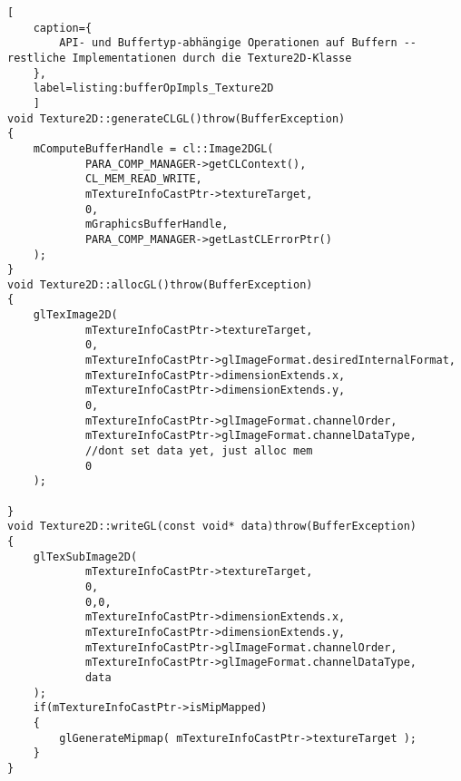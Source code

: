 \begin{lstlisting}[
	caption={
		API- und Buffertyp-abhängige Operationen auf Buffern -- restliche Implementationen durch die Texture2D-Klasse
	},	
	label=listing:bufferOpImpls_Texture2D
	]	
void Texture2D::generateCLGL()throw(BufferException)
{
	mComputeBufferHandle = cl::Image2DGL(
			PARA_COMP_MANAGER->getCLContext(),
			CL_MEM_READ_WRITE,
			mTextureInfoCastPtr->textureTarget,
			0,
			mGraphicsBufferHandle,
			PARA_COMP_MANAGER->getLastCLErrorPtr()
	);
}
void Texture2D::allocGL()throw(BufferException)
{
	glTexImage2D(
			mTextureInfoCastPtr->textureTarget,
			0,
			mTextureInfoCastPtr->glImageFormat.desiredInternalFormat,
			mTextureInfoCastPtr->dimensionExtends.x,
			mTextureInfoCastPtr->dimensionExtends.y,
			0,
			mTextureInfoCastPtr->glImageFormat.channelOrder,
			mTextureInfoCastPtr->glImageFormat.channelDataType,
			//dont set data yet, just alloc mem
			0
	);

}
void Texture2D::writeGL(const void* data)throw(BufferException)
{
	glTexSubImage2D(
			mTextureInfoCastPtr->textureTarget,
			0,
			0,0,
			mTextureInfoCastPtr->dimensionExtends.x,
			mTextureInfoCastPtr->dimensionExtends.y,
			mTextureInfoCastPtr->glImageFormat.channelOrder,
			mTextureInfoCastPtr->glImageFormat.channelDataType,
			data
	);
	if(mTextureInfoCastPtr->isMipMapped)
	{
		glGenerateMipmap( mTextureInfoCastPtr->textureTarget );
	}
}
\end{lstlisting}
